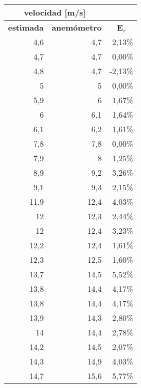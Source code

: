 \begin{table}[H]
	\centering
	\begin{tabular}{|r|r|r}
		\cline{1-2}
		\multicolumn{2}{|c|}{velocidad {[}m/s{]}} & \multicolumn{1}{l}{} \\ \hline
		\multicolumn{1}{|c|}{\textbf{estimada}} & \multicolumn{1}{c|}{\textbf{anemómetro}} & \multicolumn{1}{c|}{\textbf{E$_r$}} \\ \hline
		4,6 & 4,7 & \multicolumn{1}{r|}{2,13\%} \\ \hline
		4,7 & 4,7 & \multicolumn{1}{r|}{0,00\%} \\ \hline
		4,8 & 4,7 & \multicolumn{1}{r|}{-2,13\%} \\ \hline
		5 & 5 & \multicolumn{1}{r|}{0,00\%} \\ \hline
		5,9 & 6 & \multicolumn{1}{r|}{1,67\%} \\ \hline
		6 & 6,1 & \multicolumn{1}{r|}{1,64\%} \\ \hline
		6,1 & 6,2 & \multicolumn{1}{r|}{1,61\%} \\ \hline
		7,8 & 7,8 & \multicolumn{1}{r|}{0,00\%} \\ \hline
		7,9 & 8 & \multicolumn{1}{r|}{1,25\%} \\ \hline
		8,9 & 9,2 & \multicolumn{1}{r|}{3,26\%} \\ \hline
		9,1 & 9,3 & \multicolumn{1}{r|}{2,15\%} \\ \hline
		11,9 & 12,4 & \multicolumn{1}{r|}{4,03\%} \\ \hline
		12 & 12,3 & \multicolumn{1}{r|}{2,44\%} \\ \hline
		12 & 12,4 & \multicolumn{1}{r|}{3,23\%} \\ \hline
		12,2 & 12,4 & \multicolumn{1}{r|}{1,61\%} \\ \hline
		12,3 & 12,5 & \multicolumn{1}{r|}{1,60\%} \\ \hline
		13,7 & 14,5 & \multicolumn{1}{r|}{5,52\%} \\ \hline
		13,8 & 14,4 & \multicolumn{1}{r|}{4,17\%} \\ \hline
		13,8 & 14,4 & \multicolumn{1}{r|}{4,17\%} \\ \hline
		13,9 & 14,3 & \multicolumn{1}{r|}{2,80\%} \\ \hline
		14 & 14,4 & \multicolumn{1}{r|}{2,78\%} \\ \hline
		14,2 & 14,5 & \multicolumn{1}{r|}{2,07\%} \\ \hline
		14,3 & 14,9 & \multicolumn{1}{r|}{4,03\%} \\ \hline
		14,7 & 15,6 & \multicolumn{1}{r|}{5,77\%} \\ \hline

\end{tabular}
\end{table}
